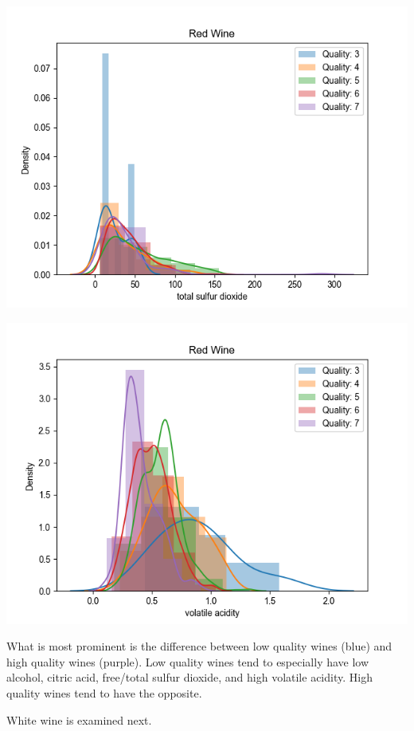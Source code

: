 \documentclass[12pt, letterpaper]{article}
\begin{document}
\includegraphics[scale=\myscale]{red_quality_dist_total_sulfur_dioxide.png}

\includegraphics[scale=\myscale]{red_quality_dist_volatile_acidity.png}

What is most prominent is the difference between low quality wines (blue) and high quality wines (purple). Low quality wines tend to especially have low alcohol, citric acid, free/total sulfur dioxide, and high volatile acidity. High quality wines tend to have the opposite.

White wine is examined next.
\end{document}

